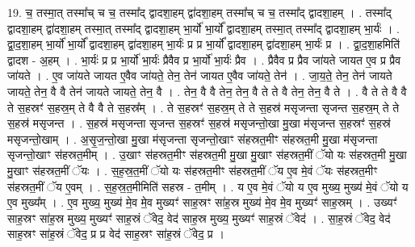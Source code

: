 \documentclass[17pt]{extarticle}
\begin{document}
19. च॒ तस्मा॒त् तस्मा᳚च् च च॒ तस्मा᳚द् द्वादशा॒हम् द्वा॑दशा॒हम् तस्मा᳚च् च च॒ तस्मा᳚द् द्वादशा॒हम् । . तस्मा᳚द् द्वादशा॒हम् द्वा॑दशा॒हम् तस्मा॒त् तस्मा᳚द् द्वादशा॒हम् भा॒र्यो॑ भा॒र्यो᳚ द्वादशा॒हम् तस्मा॒त् तस्मा᳚द् द्वादशा॒हम् भा॒र्यः॑ । . द्वा॒द॒शा॒हम् भा॒र्यो॑ भा॒र्यो᳚ द्वादशा॒हम् द्वा॑दशा॒हम् भा॒र्यः॑ प्र प्र भा॒र्यो᳚ द्वादशा॒हम् द्वा॑दशा॒हम् भा॒र्यः॑ प्र । . द्वा॒द॒शा॒हमिति॑ द्वादश - अ॒हम् । . भा॒र्यः॑ प्र प्र भा॒र्यो॑ भा॒र्यः॑ प्रैवैव प्र भा॒र्यो॑ भा॒र्यः॑ प्रैव । . प्रैवैव प्र प्रैव जा॑यते जायत ए॒व प्र प्रैव जा॑यते । . ए॒व जा॑यते जायत ए॒वैव जा॑यते॒ तेन॒ तेन॑ जायत ए॒वैव जा॑यते॒ तेन॑ । . जा॒य॒ते॒ तेन॒ तेन॑ जायते जायते॒ तेन॒ वै वै तेन॑ जायते जायते॒ तेन॒ वै । . तेन॒ वै वै तेन॒ तेन॒ वै ते ते वै तेन॒ तेन॒ वै ते । . वै ते ते वै वै ते स॒हस्रꣳ॑ स॒हस्र॒म् ते वै वै ते स॒हस्र᳚म् । . ते स॒हस्रꣳ॑ स॒हस्र॒म् ते ते स॒हस्र॑ मसृजन्ता सृजन्त स॒हस्र॒म् ते ते स॒हस्र॑ मसृजन्त । . स॒हस्र॑ मसृजन्ता सृजन्त स॒हस्रꣳ॑ स॒हस्र॑ मसृजन्तो॒खा मु॒खा म॑सृजन्त स॒हस्रꣳ॑ स॒हस्र॑ मसृजन्तो॒खाम् । . अ॒सृ॒ज॒न्तो॒खा मु॒खा म॑सृजन्ता सृजन्तो॒खाꣳ स॑हस्रत॒मीꣳ स॑हस्रत॒मी मु॒खा म॑सृजन्ता सृजन्तो॒खाꣳ स॑हस्रत॒मीम् । . उ॒खाꣳ स॑हस्रत॒मीꣳ स॑हस्रत॒मी मु॒खा मु॒खाꣳ स॑हस्रत॒मीं ॅयो यः स॑हस्रत॒मी मु॒खा मु॒खाꣳ स॑हस्रत॒मीं ॅयः । . स॒ह॒स्र॒त॒मीं ॅयो यः स॑हस्रत॒मीꣳ स॑हस्रत॒मीं ॅय ए॒व मे॒वं ॅयः स॑हस्रत॒मीꣳ स॑हस्रत॒मीं ॅय ए॒वम् । . स॒ह॒स्र॒त॒मीमिति॑ सहस्र - त॒मीम् । . य ए॒व मे॒वं ॅयो य ए॒व मुख्य॒ मुख्य॑ मे॒वं ॅयो य ए॒व मुख्य᳚म् । . ए॒व मुख्य॒ मुख्य॑ मे॒व मे॒व मुख्यꣳ॑ साह॒स्रꣳ सा॑ह॒स्र मुख्य॑ मे॒व मे॒व मुख्यꣳ॑ साह॒स्रम् । . उख्यꣳ॑ साह॒स्रꣳ सा॑ह॒स्र मुख्य॒ मुख्यꣳ॑ साह॒स्रं ॅवेद॒ वेद॑ साह॒स्र मुख्य॒ मुख्यꣳ॑ साह॒स्रं ॅवेद॑ । . सा॒ह॒स्रं ॅवेद॒ वेद॑ साह॒स्रꣳ सा॑ह॒स्रं ॅवेद॒ प्र प्र वेद॑ साह॒स्रꣳ सा॑ह॒स्रं ॅवेद॒ प्र । \newline
\end{document}
